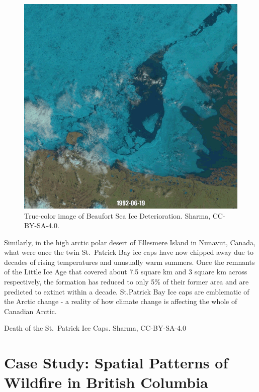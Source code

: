 \documentclass[
]{book}
\begin{document}
\begin{figure}
\centering
\includegraphics{images/13-Beaufort-Sea-Ice.gif}
\caption{\label{fig:14-Beaufort-Sea-Ice}True-color image of Beaufort Sea Ice Deterioration. Sharma, CC-BY-SA-4.0.}
\end{figure}

Similarly, in the high arctic polar desert of Ellesmere Island in Nunavut, Canada, what were once the twin St.~Patrick Bay ice caps have now chipped away due to decades of rising temperatures and unusually warm summers. Once the remnants of the Little Ice Age that covered about 7.5 square km and 3 square km across respectively, the formation has reduced to only 5\% of their former area and are predicted to extinct within a decade. St.Patrick Bay Ice caps are emblematic of the Arctic change - a reality of how climate change is affecting the whole of Canadian Arctic.

\label{container}

Death of the St.~Patrick Ice Caps. Sharma, CC-BY-SA-4.0

\section{Case Study: Spatial Patterns of Wildfire in British Columbia}\label{case-study-spatial-patterns-of-wildfire-in-british-columbia}
\end{document}

